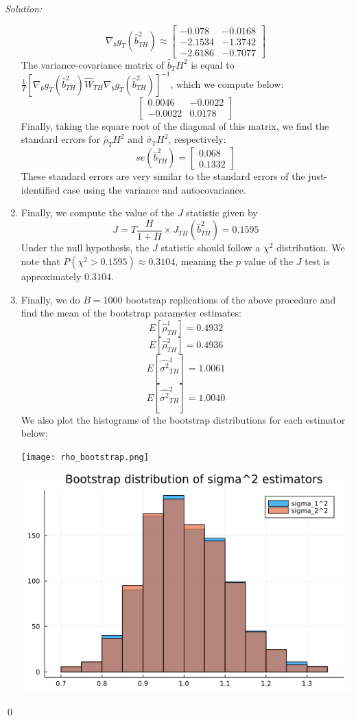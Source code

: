 \documentclass[12pt]{article}
\newenvironment{sol}
    {\emph{Solution:}
    }
    {
    \qed
    }
\begin{document}
\begin{sol}
\begin{enumerate}[label=\alph*) ]
        \[\nabla_b g_T(\hat{b}_{TH}^2) \approx \begin{bmatrix}-0.078 &-0.0168\\ -2.1534& -1.3742\\ -2.6186 &-0.7077\end{bmatrix}\]
        The variance-covariance matrix of $\hat{b}_TH^2$ is equal to $\frac{1}{T}[\nabla_b g_T(\hat{b}_{TH}^2) \hat{W}_{TH} \nabla_b g_T(\hat{b}_{TH}^2)]^{-1}$, which we compute below:
        \[\begin{bmatrix} 0.0046 &-0.0022\\ -0.0022 &0.0178\end{bmatrix}\]
        Finally, taking the square root of the diagonal of this matrix, we find the standard errors for $\hat{\rho}_TH^2$ and $\hat{\sigma}_TH^2$, respectively:
        \[se(\hat{b}_{TH}^2) = \begin{bmatrix} 0.068\\ 0.1332\end{bmatrix}\]
        These standard errors are very similar to the standard errors of the just-identified case using the variance and autocovariance.
        \item Finally, we compute the value of the $J$ statistic given by
        \[J = T \frac{H}{1 + H}\times J_{TH}(\hat{b}_{TH}^2) = 0.1595\]
        Under the null hypothesis, the $J$ statistic should follow a $\chi^2$ distribution. We note that $P(\chi^2 > 0.1595) \approx 0.3104$, meaning the $p$ value of the $J$ test is approximately $0.3104$. 
        \item Finally, we do $B=1000$ bootstrap replications of the above procedure and find the mean of the bootstrap parameter estimates:
        \[E[\hat{\rho}_{TH}^1] = 0.4932\]
        \[E[\hat{\rho}_{TH}^2] = 0.4936\]
        \[E[\hat{\sigma^2}_{TH}^1] = 1.0061\]
        \[E[\hat{\sigma^2}_{TH}^2] = 1.0040\]
        We also plot the histograms of the bootstrap distributions for each estimator below:
        \begin{center}
            \texttt{[image: rho\_bootstrap.png]}
        \end{center}
        \begin{center}
            \includegraphics[scale=0.5]{sigma_bootstrap.png}
        \end{center}
    \end{enumerate}
\end{sol}
\end{document}
